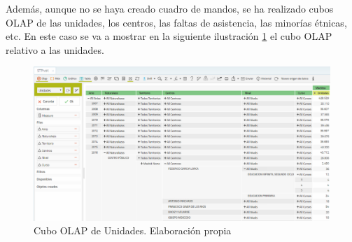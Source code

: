 \begin{subappendices}
Además, aunque no se haya creado cuadro de mandos, se ha realizado cubos OLAP de las unidades, los centros, las faltas de asistencia, las minorías étnicas, etc. En este caso se va a mostrar en la siguiente ilustración \ref{fig:STPivotUnidades} el cubo OLAP relativo a las unidades.

\begin{figure}[htb]
	\centering
	\caption{Cubo OLAP de Unidades. Elaboración propia}
	\label{fig:STPivotUnidades}
	\includegraphics[width=1\textwidth]{recursos/STPivotUnidades}
\end{figure}
\FloatBarrier

\end{subappendices}


